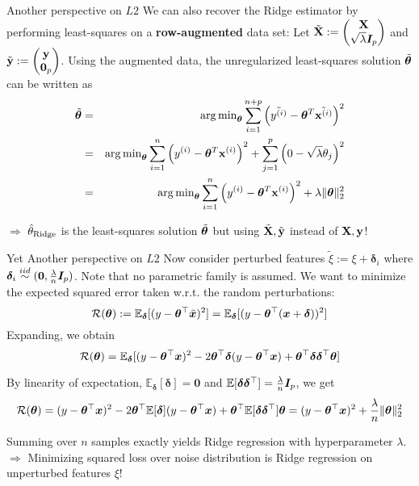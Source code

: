 \documentclass[11pt,compress,t,notes=noshow, xcolor=table]{beamer}
\begin{document}
\begin{vbframe}{Another perspective on $L2$}
We can also recover the Ridge estimator by performing least-squares on a \textbf{row-augmented} data set: Let $\tilde{\mathbf{X}}:= \begin{pmatrix} \mathbf{X} \\ \sqrt{\lambda} \boldsymbol{I}_{p} \end{pmatrix}$ and $\tilde{\mathbf{y}} := \begin{pmatrix}
    \mathbf{y} \\ \bm{0}_{p}
\end{pmatrix}$. Using the augmented data, the unregularized least-squares solution $\tilde{\bm{\theta}}$ can be written as
\begin{eqnarray*}
\tilde{\thetab} &=& \argmin_{\thetab} 
\sum_{i=1}^{n+p} \left(\tilde{\yi} - \thetab^T \tilde{\xi} \right)^2 \\ &=& \argmin_{\thetab} 
\sum_{i=1}^{n} \left(\yi - \thetab^T \xi \right)^2 + \sum_{j=1}^{p} \left(0 - \sqrt{\lambda} \theta_j \right)^2 \\ %
&=& \argmin_{\thetab} \sumin \left(\yi - \thetab^T \xi \right)^2 + \lambda \|\thetab\|_2^2
\end{eqnarray*}

$\Longrightarrow$ $\hat{\theta}_{\text{Ridge}}$ is the least-squares solution $\tilde{\bm{\theta}}$ but using $\tilde{\mathbf{X}},\tilde{\mathbf{y}}$ instead of $\mathbf{X}, \mathbf{y}$!
\end{vbframe}

\begin{vbframe}{Yet Another perspective on $L2$}
Now consider perturbed features $ \tilde{\xi}:= \xi + \bm{\delta}_i$ where $\bm{\delta}_i \overset{iid}{\sim} (\bm{0},\frac{\lambda}{n} \boldsymbol{I}_p)$. Note that no parametric family is assumed. We want to minimize the expected squared error taken w.r.t. the random perturbations:
$$\mathcal{R}(\bm{\theta}):= \mathbb{E}_{\bm{\delta}}[(y-\bm{\theta}^{\top}\tilde{\bm{x}})^2] = \mathbb{E}_{\bm{\delta}}[(y-\bm{\theta}^{\top}(\bm{x}+\bm{\delta}))^2]$$
Expanding, we obtain
$$\mathcal{R}(\bm{\theta}) = \mathbb{E}_{\bm{\delta}}[(y-\bm{\theta}^{\top}\bm{x})^2 - 2 \bm{\theta}^{\top}\bm{\delta}(y-\bm{\theta}^{\top}\bm{x}) + \bm{\theta}^{\top}\bm{\delta}\bm{\delta}^{\top}\bm{\theta}]$$

By linearity of expectation, $\mathbb{E}_{\bm{\delta}}[\bm{\delta}]=\bm{0}$ and $\mathbb{E}[\bm{\delta}\bm{\delta}^{\top}]=\frac{\lambda}{n} \boldsymbol{I}_p$, we get
$$\mathcal{R}(\bm{\theta})=(y-\bm{\theta}^{\top}\bm{x})^2 - 2 \bm{\theta}^{\top}\mathbb{E}[\bm{\delta}](y-\bm{\theta}^{\top}\bm{x}) + \bm{\theta}^{\top}\mathbb{E}[\bm{\delta}\bm{\delta}^{\top}]\bm{\theta} = (y-\bm{\theta}^{\top}\bm{x})^2+\frac{\lambda}{n} \Vert \bm{\theta} \Vert_2^2$$

Summing over $n$ samples exactly yields Ridge regression with hyperparameter $\lambda$.\\
$\Longrightarrow$ Minimizing squared loss over noise distribution is Ridge regression on unperturbed features $\xi$!

\end{vbframe}






\endlecture
\end{document}
